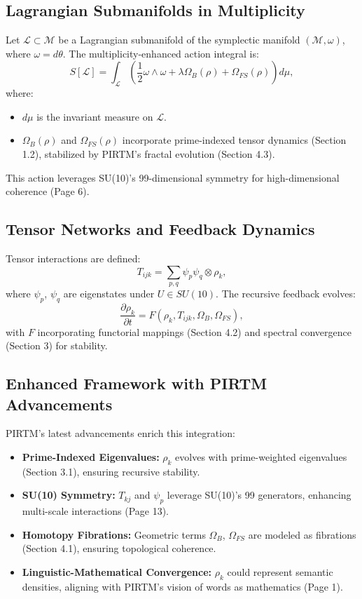 \documentclass{article}
\theoremstyle{plain}
\begin{document}
\subsection{Lagrangian Submanifolds in Multiplicity}
Let \( \mathcal{L} \subset \mathcal{M} \) be a Lagrangian submanifold of the symplectic manifold \( (\mathcal{M}, \omega) \), where \( \omega = d\theta \). The multiplicity-enhanced action integral is:
\begin{equation}
S[\mathcal{L}] = \int_{\mathcal{L}} \left( \frac{1}{2} \omega \wedge \omega + \lambda \Omega_B(\rho) + \Omega_{FS}(\rho) \right) d\mu,
\end{equation}
where:
\begin{itemize}
    \item \( d\mu \) is the invariant measure on \( \mathcal{L} \).
    \item \( \Omega_B(\rho) \) and \( \Omega_{FS}(\rho) \) incorporate prime-indexed tensor dynamics (Section 1.2), stabilized by PIRTM’s fractal evolution (Section 4.3).
\end{itemize}
This action leverages SU(10)’s 99-dimensional symmetry for high-dimensional coherence (Page 6).

\subsection{Tensor Networks and Feedback Dynamics}
Tensor interactions are defined:
\begin{equation}
T_{ijk} = \sum_{p,q} \psi_p \psi_q \otimes \rho_k,
\end{equation}
where \( \psi_p \), \( \psi_q \) are eigenstates under \( U \in SU(10) \). The recursive feedback evolves:
\begin{equation}
\frac{\partial \rho_k}{\partial t} = F\left(\rho_k, T_{ijk}, \Omega_B, \Omega_{FS}\right),
\end{equation}
with \( F \) incorporating functorial mappings (Section 4.2) and spectral convergence (Section 3) for stability.

\subsection{Enhanced Framework with PIRTM Advancements}
PIRTM’s latest advancements enrich this integration:
\begin{itemize}
    \item \textbf{Prime-Indexed Eigenvalues:} \( \rho_k \) evolves with prime-weighted eigenvalues (Section 3.1), ensuring recursive stability.
    \item \textbf{SU(10) Symmetry:} \( T_{kj} \) and \( \psi_p \) leverage SU(10)’s 99 generators, enhancing multi-scale interactions (Page 13).
    \item \textbf{Homotopy Fibrations:} Geometric terms \( \Omega_B \), \( \Omega_{FS} \) are modeled as fibrations (Section 4.1), ensuring topological coherence.
    \item \textbf{Linguistic-Mathematical Convergence:} \( \rho_k \) could represent semantic densities, aligning with PIRTM’s vision of words as mathematics (Page 1).
\end{itemize}
\end{document}
